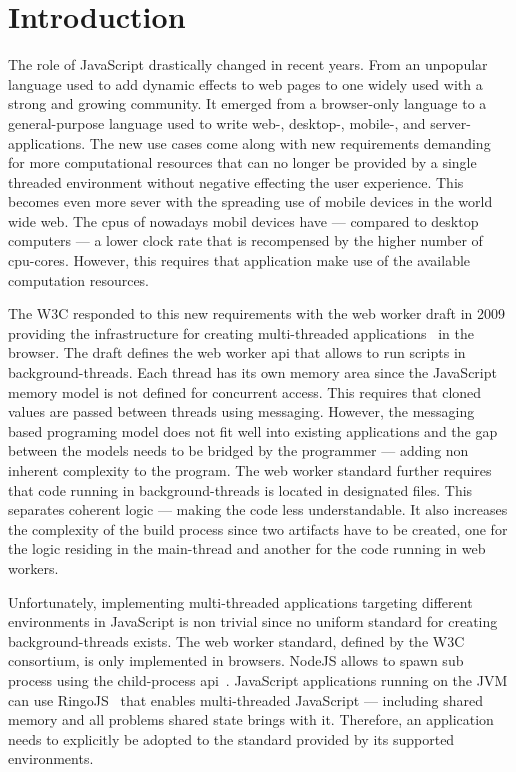 \section{Introduction}\label{sec:introduction}
The role of JavaScript drastically changed in recent years. From an unpopular language used to add dynamic effects to web pages to one widely used with a strong and growing community. It emerged from a browser-only language to a general-purpose language used to write web-, desktop-, mobile-, and server-applications. The new use cases come along with new requirements demanding for more computational resources that can no longer be provided by a single threaded environment without negative effecting the user experience. This becomes even more sever with the spreading use of mobile devices in the world wide web. The cpus of nowadays mobil devices have  --- compared to desktop computers --- a lower clock rate that is recompensed by the higher number of cpu-cores. However, this requires that application make use of the available computation resources. 

The W3C responded to this new requirements with the web worker draft in 2009 providing the infrastructure for creating multi-threaded applications~\cite{w3cWebWorker} in the browser. The draft defines the web worker api that allows to run scripts in background-threads. Each thread has its own memory area since the JavaScript memory model is not defined for concurrent access. This requires that cloned values are passed between threads using messaging. However, the messaging based programing model does not fit well into existing applications and the gap between the models needs to be bridged by the programmer --- adding non inherent complexity to the program. The web worker standard further requires that code running in background-threads is located in designated files. This separates coherent logic --- making the code less understandable. It also increases the complexity of the build process since two artifacts have to be created, one for the logic residing in the main-thread and another for the code running in web workers. 

Unfortunately, implementing multi-threaded applications targeting different environments in JavaScript is non trivial since no uniform standard for creating background-threads exists. The web worker standard, defined by the W3C consortium, is only implemented in browsers. NodeJS allows to spawn sub process using the child-process api~\cite{childProcess}. JavaScript applications running on the JVM can use RingoJS~\cite{RingoJS} that enables multi-threaded JavaScript --- including shared memory and all problems shared state brings with it. Therefore, an application needs to explicitly be adopted to the standard provided by its supported environments.

